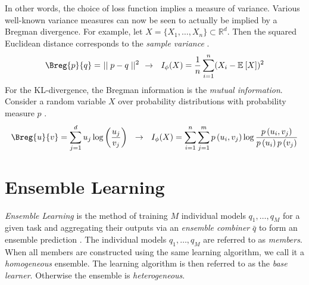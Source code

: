 \documentclass[
	twoside=false, %
]{kaobook}
\begin{document}
In other words, the choice of loss function implies a measure of variance. Various well-known variance measures can now be seen to actually be implied by a Bregman divergence.
For example, let $X = \{ X_{1}, \dots, X_{n} \} \subset \mathbb{R}^d$. Then the squared Euclidean distance corresponds to the \textit{sample variance} \cite{banerjee_ClusteringBregmanDivergences_2004}.
$$
\Breg{p}{q} =~\mid\mid p-q\mid\mid^2 ~ ~ \rightarrow ~ ~ 
I_{\phi}(X) = \frac{1}{n} \sum_{i=1}^n (X_{i} - \mathbb{E}_{}\left[ X \right] )^2
$$
For the KL-divergence, the Bregman information is the \textit{mutual information}. Consider a random variable $X$ over probability distributions with probability measure $p$ \cite{banerjee_ClusteringBregmanDivergences_2004}.
$$
\Breg{u}{v} = \sum_{j=1}^d u_{j} \log \left( \frac{u_{j}}{v_{j}} \right) 
~ ~ \rightarrow ~ ~  I_{\phi}(X) = 
\sum_{i=1}^n \sum_{j=1}^m p\left(u_i, v_j\right) \log \frac{p\left(u_i, v_j\right)}{p\left(u_i\right) p\left(v_j\right)}
$$









\chapter{Ensemble Learning}
\label{chapter:ensemble-learning}

\textit{Ensemble Learning} is the method of training $M$ individual models $q_{1}, \dots, q_{M}$ for a given task and aggregating their outputs via an \textit{ensemble combiner} $\bar{q}$ to form an ensemble prediction \cite{zhou_EnsembleMethodsFoundations_2012}.
The individual models $q_{1}, \dots, q_{M}$ are referred to as \textit{members}. When all members are constructed using the same learning algorithm, we call it a \textit{homogeneous} ensemble. The learning algorithm is then referred to as the \textit{base learner}. Otherwise the ensemble is \textit{heterogeneous}. 
\end{document}
